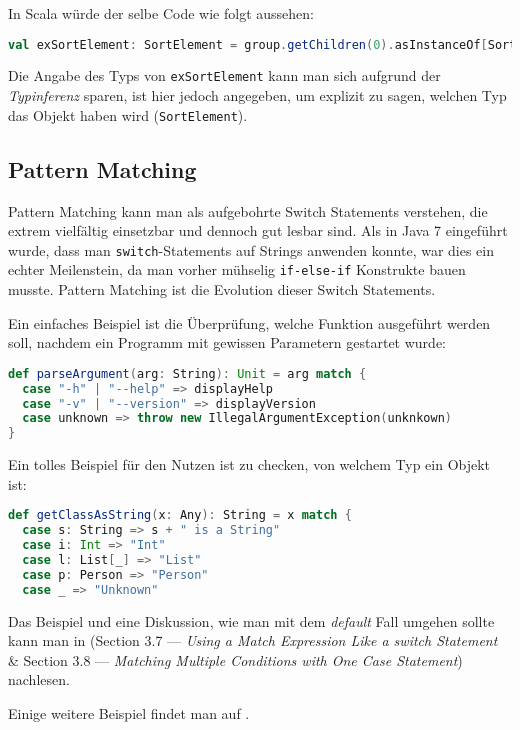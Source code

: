 In Scala würde der selbe Code wie folgt aussehen:
\begin{lstlisting}[language=Scala,numbers=none,caption=Casting in Scala: Von Node zu SortElement]
val exSortElement: SortElement = group.getChildren(0).asInstanceOf[SortElement]
\end{lstlisting}

Die Angabe des Typs von \texttt{exSortElement} kann man sich aufgrund der \textit{Typinferenz} sparen, ist hier jedoch angegeben, um explizit zu sagen, welchen Typ das Objekt haben wird (\texttt{SortElement}).

\subsection{Pattern Matching}
Pattern Matching kann man als aufgebohrte Switch Statements verstehen, die extrem vielfältig einsetzbar und dennoch gut lesbar sind. Als in Java 7 eingeführt wurde, dass man \texttt{switch}-Statements auf Strings anwenden konnte, war dies ein echter Meilenstein, da man vorher mühselig \texttt{if-else-if} Konstrukte bauen musste. Pattern Matching ist die Evolution dieser Switch Statements.

Ein einfaches Beispiel ist die Überprüfung, welche Funktion ausgeführt werden soll, nachdem ein Programm mit gewissen Parametern gestartet wurde:

\begin{lstlisting}[language=Scala, caption=Pattern Matching mit Strings]
def parseArgument(arg: String): Unit = arg match {
  case "-h" | "--help" => displayHelp
  case "-v" | "--version" => displayVersion
  case unknown => throw new IllegalArgumentException(unknkown)
}
\end{lstlisting}

Ein tolles Beispiel für den Nutzen ist zu checken, von welchem Typ ein Objekt ist:
\begin{lstlisting}[language=Scala,caption=Type-Checking mit Pattern Matching]
def getClassAsString(x: Any): String = x match {
  case s: String => s + " is a String"
  case i: Int => "Int"
  case l: List[_] => "List"
  case p: Person => "Person"
  case _ => "Unknown"
\end{lstlisting}

Das Beispiel und eine Diskussion, wie man mit dem \textit{default} Fall umgehen sollte kann man in \cite{ScalaCookbook} (Section 3.7 --- \textit{Using a Match Expression Like a switch Statement} \& Section 3.8 --- \textit{Matching Multiple Conditions with One Case Statement}) nachlesen.

Einige weitere Beispiel findet man auf \cite{PatternMatchingExample} .
